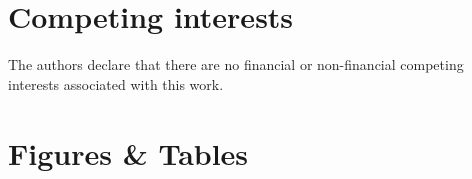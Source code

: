 \documentclass[fleqn,10pt]{wlscirep}
\newcommand{\todo}[1]{{\color{red} #1}}
\begin{document}



\section*{Competing interests}

The authors declare that there are no financial or non-financial competing interests associated with this work.


\section*{Figures \& Tables}



\end{document}
